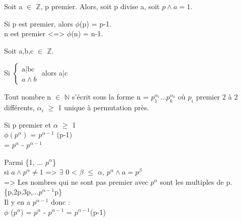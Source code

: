 \begin{cor}
	Soit a $\in$ $\mathbb{Z}$, p premier. Alors, soit p divise a, soit $p \wedge a = 1$.
\end{cor}
\begin{cor}
 Si p est premier, alors $\phi$(p) = p-1.\\
  n est premier <=> $\phi$(n) = n-1.
\end{cor}
\begin{lem}
	Soit a,b,c $\in$ $\mathbb{Z}$.
	\begin{center}
		Si 
		$\left\{
		\begin{array}{ll}
			\mbox{a|bc} \\
			a \wedge b
		\end{array}
		\right.$
		alors a|c
	\end{center}
\end{lem}
\begin{cor}
	Tout nombre n $\in$ $\mathbb{N}$ s'écrit sous la forme n = $p_{1}^{\alpha _{1}} ... p_{k}^{\alpha _{k}}$ où $p_{i}$ premier 2 à 2 différents, $\alpha _{i}$ $\geq$ 1 unique à permutation près.
\end{cor}
\begin{cor}
	Si p premier et $\alpha$ $\geq$ 1 \\
			$\phi(p^{\alpha})$ = $p^{\alpha -1}$ (p-1) \\
			= $p^{\alpha}$ - $p^{\alpha -1}$
\end{cor}
\begin{dem}
	Parmi \{1, ... $p^{\alpha}$\}\\
	si $a \wedge p^{\alpha} \not= 1$ => $\exists$ 0 < $\beta$ $\leq$ $\alpha$, $p^{\alpha} \wedge a = p ^{\beta}$\\
	=> Les nombres qui ne sont pas premier avec $p^{\alpha}$ sont les multiples de p.\\
	\{p,2p,3p,...$p^{\alpha-1}$p\}\\
	Il y en a $p^{\alpha-1}$ donc : \\
	$\phi$ ($p^{\alpha}$) 	= $p^{\alpha}$ - $p^{\alpha-1}$
							= $p^{\alpha-1}$(p-1)
\end{dem}					
	
